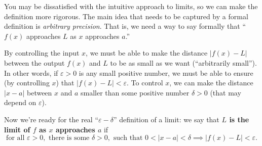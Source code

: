 You may be dissatisfied with the intuitive approach to limits, so we can make the definition more rigorous. The main idea that needs to be captured by a formal definition is \textit{arbitrary precision}. That is, we need a way to say formally that ``$f(x)$ approaches $L$ as $x$ approaches $a$.''

By controlling the input $x$, we must be able to make the distance $|f(x)-L|$ between the output $f(x)$ and $L$ to be as small as we want (``arbitrarily small''). In other words, if $\varepsilon>0$ is any small positive number, we must be able to ensure (by controlling $x$) that $|f(x)-L| < \varepsilon$. To control $x$, we can make the distance $|x-a|$ between $x$ and $a$ smaller than some positive number $\delta > 0$ (that may depend on $\varepsilon$).

Now we're ready for the real ``$\varepsilon-\delta$'' definition of a limit: we say that \textbf{$L$ is the limit of $f$ as $x$ approaches $a$} if
$$\text{for all } \varepsilon > 0, \text{ there is some } \delta > 0, \text{ such that } 0<|x - a| < \delta \implies |f(x) - L| <\varepsilon.$$


